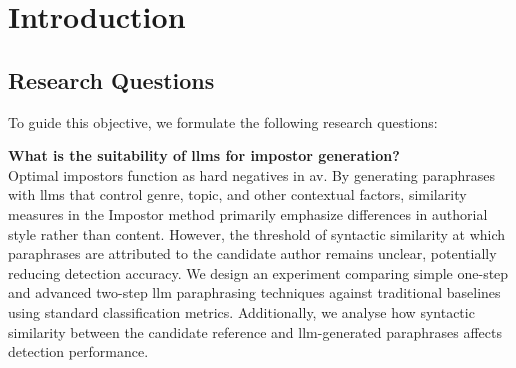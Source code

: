 \chapter{Introduction}
\label{chap:introduction}





\section{Research Questions}
\label{sec:research_questions}
To guide this objective, we formulate the following research questions:
\begin{questions}
    \item \textbf{What is the suitability of \acp{llm} for impostor generation?} \label{enum:rq1} \hfill \\
    Optimal impostors function as hard negatives in \ac{av}.
    By generating paraphrases with \acp{llm} that control genre, topic, and other contextual factors, similarity measures in the Impostor method primarily emphasize differences in authorial style rather than content.
    However, the threshold of syntactic similarity at which paraphrases are attributed to the candidate author remains unclear, potentially reducing detection accuracy.
    We design an experiment comparing simple one-step and advanced two-step \ac{llm} paraphrasing techniques against traditional baselines using standard classification metrics.
    Additionally, we analyse how syntactic similarity between the candidate reference and \ac{llm}-generated paraphrases affects detection performance.


\end{questions}
